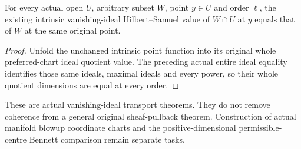\begin{theorem}
\label{hir:actual-any-subset-open-intrinsic-hs}
\leanok
For every actual open $U$, arbitrary subset $W$, point $y\in U$ and
order $\ell$, the existing intrinsic vanishing-ideal Hilbert--Samuel
value of $W\cap U$ at $y$ equals that of $W$ at the same original point.
\end{theorem}
\begin{proof}
Unfold the unchanged intrinsic point function into its original whole
preferred-chart ideal quotient value. The preceding actual entire ideal
equality identifies those same ideals, maximal ideals and every power,
so their whole quotient dimensions are equal at every order.
\end{proof}

These are actual vanishing-ideal transport theorems. They do not remove
coherence from a general original sheaf-pullback theorem. Construction
of actual manifold blowup coordinate charts and the positive-dimensional
permissible-centre Bennett comparison remain separate tasks.
